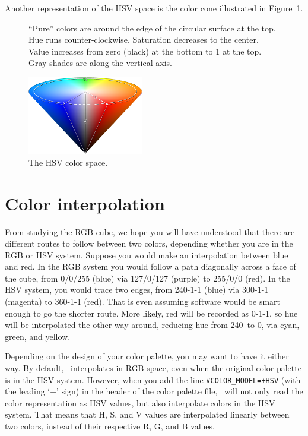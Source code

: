 Another representation of the HSV space is the color cone illustrated in Figure~\ref{fig:hsv-cone}.

\begin{figure}[h]
   \parbox[b]{0.54\textwidth}{``Pure'' colors are around the edge of the circular surface at the top. Hue runs counter-clockwise. Saturation decreases to the center. Value increases from zero (black) at the bottom to 1 at the top. Gray shades are along the vertical axis.}%
   \hfill%
   \includegraphics[width=0.45\textwidth,bb=0 0 750 508]{fig/hsv-cone.png}%
   \caption{The HSV color space.}
   \label{fig:hsv-cone}
\end{figure}

\section{Color interpolation}
From studying the RGB cube, we hope you will have understood that there are different routes to follow between two colors, depending whether you are in the RGB or HSV system. Suppose you would make an interpolation between blue and red. In the RGB system you would follow a path diagonally across a face of the cube, from 0/0/255 (blue) via 127/0/127 (purple) to 255/0/0 (red). In the HSV system, you would trace two edges, from 240-1-1 (blue) via 300-1-1 (magenta) to 360-1-1 (red). That is even assuming software would be smart enough to go the shorter route. More likely, red will be recorded as 0-1-1, so hue will be interpolated the other way around, reducing hue from 240\DS\ to 0\DS, via cyan, green, and yellow.

Depending on the design of your color palette, you may want to have it either way. By default, \GMT\ interpolates in RGB space, even when the original color palette is in the HSV system. However, when you add the line \texttt{\#COLOR\_MODEL=+HSV} (with the leading `+' sign) in the header of the color palette file, \GMT\ will not only read the color representation as HSV values, but also interpolate colors in the HSV system. That means that H, S, and V values are interpolated linearly between two colors, instead of their respective R, G, and B values.


